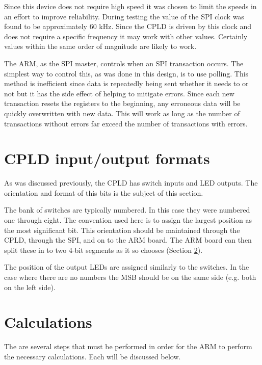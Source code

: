 \documentclass{article}
\begin{document}
Since this device does not require high speed it was
chosen to limit the speeds in an effort to improve reliability.
During testing the value of the SPI clock was found to be approximately
60 kHz.
Since the CPLD is driven by this clock and does not require a specific
frequency it may work with other values.
Certainly values within the same order of magnitude are likely to work.

The ARM, as the SPI master, controls when an SPI transaction occurs.
The simplest way to control this, as was done in this design, is to use polling.
This method is inefficient since data is repeatedly being sent
whether it needs to or not
but it has the side effect of helping to mitigate errors.
Since each new transaction resets the registers to the beginning,
any erroneous data will be quickly overwritten with new data.
This will work as long as the number of transactions without errors
far exceed the number of transactions with errors.


\section{CPLD input/output formats}
\label{sec:cpld}

As was discussed previously, the CPLD has switch inputs
and LED outputs.
The orientation and format of this bits is the subject of
this section.

The bank of switches are typically numbered.
In this case they were numbered one through eight.
The convention used here is to assign the largest
position as the most significant bit.
This orientation should be maintained through the CPLD,
through the SPI, and on to the ARM board.
The ARM board can then split these in to two 4-bit segments
as it so chooses (Section \ref{sec:calc}).

The position of the output LEDs are assigned similarly to
the switches.
In the case where there are no numbers the MSB should be
on the same side (e.g. both on the left side).


\section{Calculations}
\label{sec:calc}

The are several steps that must be performed in order for
the ARM to perform the necessary calculations.
Each will be discussed below.
\end{document}
